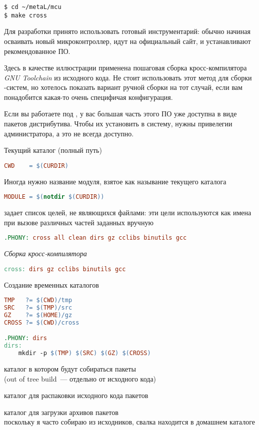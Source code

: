 
\begin{verbatim}
$ cd ~/metaL/mcu
$ make cross
\end{verbatim}

Для разработки принято использовать готовый инструментарий: обычно начиная
осваивать новый микроконтроллер, идут на официальный сайт, и устанавливают
рекомендованное ПО.

Здесь в качестве иллюстрации применена пошаговая сборка кросс-компилятора
\emph{GNU Toolchain} из исходного кода. Не стоит использовать этот метод для
сборки \linux-систем, но хотелось показать вариант ручной сборки на тот случай,
если вам понадобится какая-то очень специфичая конфигурация.

Если вы работаете под \linux, у вас большая часть этого ПО уже доступна в виде
пакетов дистрибутива. Чтобы их установить в систему, нужны привелегии
администратора, а это не всегда доступно. 

\clearpage\noindent
Текущий каталог (полный путь)
\begin{lstlisting}[language=make]
CWD    = $(CURDIR)
\end{lstlisting}
Иногда нужно название модуля, взятое как называние текущего каталога
\begin{lstlisting}[language=make]
MODULE = $(notdir $(CURDIR))
\end{lstlisting}
 задает список целей, не являющихся файлами: эти цели используются
как имена при вызове различных частей  заданных вручную
\begin{lstlisting}[language=make]
.PHONY: cross all clean dirs gz cclibs binutils gcc
\end{lstlisting}
\emph{Сборка кросс-компилятора}
\begin{lstlisting}[language=make]
cross: dirs gz cclibs binutils gcc
\end{lstlisting}
Создание временных каталогов
\begin{lstlisting}[language=make]
TMP   ?= $(CWD)/tmp
SRC   ?= $(TMP)/src
GZ    ?= $(HOME)/gz
CROSS ?= $(CWD)/cross

.PHONY: dirs
dirs:
	mkdir -p $(TMP) $(SRC) $(GZ) $(CROSS)
\end{lstlisting}
\begin{description}[nosep]
\item[\file{TMP}] каталог в котором будут собираться пакеты\\(out of
tree build\ --- отдельно от исходного кода)
\item[\file{SRC}] каталог для распаковки исходного кода пакетов
\item[\file{GZ}] каталог для загрузки архивов пакетов\\
поскольку я часто собираю из исходников, свалка находится в домашнем каталоге 
\end{description}

